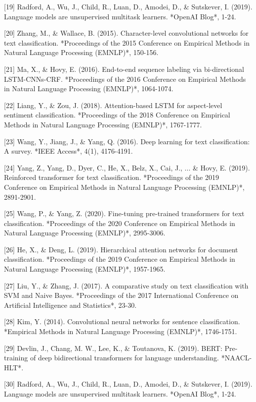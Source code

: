 [19] Radford, A., Wu, J., Child, R., Luan, D., Amodei, D., & Sutskever, I. (2019). Language models are unsupervised multitask learners. *OpenAI Blog*, 1-24.

[20] Zhang, M., & Wallace, B. (2015). Character-level convolutional networks for text classification. *Proceedings of the 2015 Conference on Empirical Methods in Natural Language Processing (EMNLP)*, 150-156.

[21] Ma, X., & Hovy, E. (2016). End-to-end sequence labeling via bi-directional LSTM-CNNs-CRF. *Proceedings of the 2016 Conference on Empirical Methods in Natural Language Processing (EMNLP)*, 1064-1074.

[22] Liang, Y., & Zou, J. (2018). Attention-based LSTM for aspect-level sentiment classification. *Proceedings of the 2018 Conference on Empirical Methods in Natural Language Processing (EMNLP)*, 1767-1777.

[23] Wang, Y., Jiang, J., & Yang, Q. (2016). Deep learning for text classification: A survey. *IEEE Access*, 4(1), 4176-4191.

[24] Yang, Z., Yang, D., Dyer, C., He, X., Belz, X., Cai, J., ... & Hovy, E. (2019). Reinforced transformer for text classification. *Proceedings of the 2019 Conference on Empirical Methods in Natural Language Processing (EMNLP)*, 2891-2901.

[25] Wang, P., & Yang, Z. (2020). Fine-tuning pre-trained transformers for text classification. *Proceedings of the 2020 Conference on Empirical Methods in Natural Language Processing (EMNLP)*, 2995-3006.

[26] He, X., & Deng, L. (2019). Hierarchical attention networks for document classification. *Proceedings of the 2019 Conference on Empirical Methods in Natural Language Processing (EMNLP)*, 1957-1965.

[27] Liu, Y., & Zhang, J. (2017). A comparative study on text classification with SVM and Naive Bayes. *Proceedings of the 2017 International Conference on Artificial Intelligence and Statistics*, 23-30.

[28] Kim, Y. (2014). Convolutional neural networks for sentence classification. *Empirical Methods in Natural Language Processing (EMNLP)*, 1746-1751.

[29] Devlin, J., Chang, M. W., Lee, K., & Toutanova, K. (2019). BERT: Pre-training of deep bidirectional transformers for language understanding. *NAACL-HLT*.

[30] Radford, A., Wu, J., Child, R., Luan, D., Amodei, D., & Sutskever, I. (2019). Language models are unsupervised multitask learners. *OpenAI Blog*, 1-24. 

